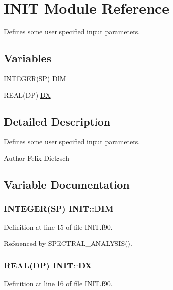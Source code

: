\hypertarget{namespaceINIT}{
\section{INIT Module Reference}
\label{namespaceINIT}
}


Defines some user specified input parameters.  


\subsection*{Variables}
\begin{DoxyCompactItemize}
\item 
INTEGER(SP) \hyperlink{namespaceINIT_a0220cec3830356e24c2d71461783251b}{DIM}
\item 
REAL(DP) \hyperlink{namespaceINIT_a2408b167edb7d420e8c30e9844d9f657}{DX}
\end{DoxyCompactItemize}


\subsection{Detailed Description}
Defines some user specified input parameters. \begin{DoxyAuthor}{Author}
Felix Dietzsch 
\end{DoxyAuthor}


\subsection{Variable Documentation}
\hypertarget{namespaceINIT_a0220cec3830356e24c2d71461783251b}{
\subsubsection[{DIM}]{\setlength{\rightskip}{0pt plus 5cm}INTEGER(SP) {\bf INIT::DIM}}}
\label{namespaceINIT_a0220cec3830356e24c2d71461783251b}


Definition at line 15 of file INIT.f90.



Referenced by SPECTRAL\_\-ANALYSIS().

\hypertarget{namespaceINIT_a2408b167edb7d420e8c30e9844d9f657}{
\subsubsection[{DX}]{\setlength{\rightskip}{0pt plus 5cm}REAL(DP) {\bf INIT::DX}}}
\label{namespaceINIT_a2408b167edb7d420e8c30e9844d9f657}


Definition at line 16 of file INIT.f90.

